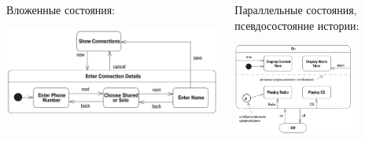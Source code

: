 \documentclass{../../slides-style}
\begin{document}
\begin{frame}
        \begin{columns}
            \begin{column}{0.5\textwidth}
                Вложенные состояния:
                \begin{center}
                    \includegraphics[width=\textwidth]{stateTransitionNestedStates.png}
                \end{center}
            \end{column}
            \begin{column}{0.5\textwidth}
                Параллельные состояния, псевдосостояние истории:
                \begin{center}
                    \includegraphics[width=0.7\textwidth]{stateTransitionParallelStates.png}
                \end{center}
            \end{column}
        \end{columns}
    \end{frame}
\end{document}
